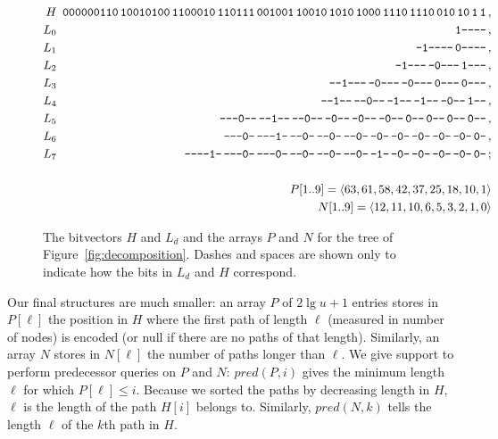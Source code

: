 \documentclass{elsarticle}
\begin{document}
\begin{figure}[t]
{\small
\begin{eqnarray*}
H   & & \!\!\!\mbox{\tt 000000110\,10010100\,1100010\,110111\,001001\,10010\,1010\,1000\,1110\,1110\,010\,10\,1\,1}\,,\\
L_0 & & \!\!\!\mbox{\tt 1--------}\,,\\
L_1 & & \!\!\!\mbox{\tt -1-------\,0-------}\,,\\
L_2 & & \!\!\!\mbox{\tt --1------\,-0------\,1------}\,,\\
L_3 & & \!\!\!\mbox{\tt ---1-----\,--0-----\,-0-----\,0-----\,0-----}\,,\\
L_4 & & \!\!\!\mbox{\tt ----1----\,---0----\,--1----\,-1----\,-0----\,1----}\,,\\
L_5 & & \!\!\!\mbox{\tt -----0---\,----1---\,---0---\,--0---\,--0---\,-0---\,0---\,0---\,0---\,0---}\,,\\
L_6 & & \!\!\!\mbox{\tt ------0--\,-----1--\,----0--\,---0--\,---0--\,--0--\,-0--\,-0--\,-0--\,-0--\,0--}\,,\\
L_7 & & \!\!\!\mbox{\tt -------1-\,------0-\,-----0-\,----0-\,----0-\,---0-\,--1-\,--0-\,--0-\,--0-\,-0-\,0-}\,; \\
\\
& & P[1..9] = \langle 63, 61, 58, 42, 37, 25, 18, 10, 1 \rangle \\
& & N[1..9] = \langle 12, 11, 10, 6, 5, 3, 2, 1, 0 \rangle
\end{eqnarray*}

\vspace*{-3mm}
}
\caption{The bitvectors $H$ and $L_d$ and the arrays $P$ and $N$ for the tree of Figure~\ref{fig:decomposition}. Dashes and spaces are shown only to indicate how the bits in $L_d$ and $H$ correspond.}
\label{fig:HandL}
\end{figure}

Our final structures are much smaller: an array $P$ of $2\lg u+1$ entries stores in $P[\ell]$ the position in $H$ where the first  path of length $\ell$ (measured in number of nodes) is encoded (or null if there are no  paths of that length). Similarly, an array $N$ stores in $N[\ell]$ the number of paths longer than $\ell$. We give support to perform predecessor queries on $P$ and $N$: $pred(P,i)$ gives the minimum length $\ell$ for which $P[\ell] \le i$. Because we sorted the  paths by decreasing length in $H$, $\ell$ is the length of the  path $H[i]$ belongs to. Similarly, $pred(N,k)$ tells the length $\ell$ of the $k$th path in $H$.
\end{document}
